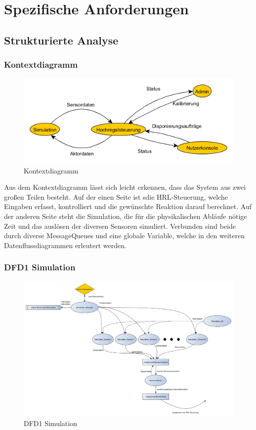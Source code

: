 \section{Spezifische Anforderungen}
\subsection{Strukturierte Analyse}
\subsubsection{Kontextdiagramm}
\begin{figure}[H]
	\centering
  \includegraphics[width=\textwidth]{DFD/kontextdiagramm.png}
	\caption{Kontextdiagramm}
	\label{fig1}
\end{figure}
Aus dem Kontextdiagramm lässt sich leicht erkennen, dass das System aus zwei großen Teilen besteht. Auf der einen Seite ist sdie HRL-Steuerung, welche Eingaben erfasst, kontrolliert und die gewünschte Reaktion darauf berechnet. Auf der anderen Seite steht die Simulation, die für die physikalischen Abläufe nötige Zeit und das auslösen der diversen Sensoren simuliert. Verbunden sind beide durch diverse MessageQueues und eine globale Variable, welche in den weiteren Datenflussdiagrammen erleutert werden.
\subsubsection{DFD1 Simulation}
\begin{figure}[H]
	\centering
  \includegraphics[width=\textwidth]{DFD/dfd1_simulation1_1.png}
	\caption{DFD1 Simulation}
	\label{fig2}
\end{figure}


